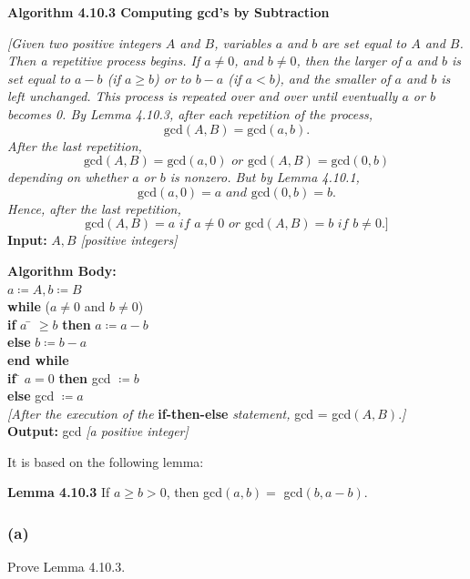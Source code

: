 \documentclass[14pt]{extarticle}
\newcommand{\cy}{\color{cyan}}
\begin{document}
\begin{tcolorbox}[colframe=cyan]
{\bf \cy Algorithm 4.10.3 Computing gcd’s by Subtraction} 

{\it [Given two positive integers $A$ and $B$, variables $a$ and $b$ are set equal to $A$ and $B$. Then a repetitive process begins. If $a \neq 0$, and $b \neq 0$, then the larger of $a$ and $b$ is set equal to $a - b$ (if $a \geq b$) or to $b - a$ (if $a < b$), and the smaller of $a$ and $b$ is left unchanged. This process is repeated over and over until eventually $a$ or $b$ becomes 0. By Lemma 4.10.3, after each repetition of the process,}
\[
\text{gcd}(A, B) = \text{gcd}(a, b).
\]
{\it After the last repetition,}
\[
\text{gcd}(A, B) = \text{gcd}(a, 0) \textit{ or } \text{gcd}(A, B) = \text{gcd}(0, b)
\]
{\it depending on whether $a$ or $b$ is nonzero. But by Lemma 4.10.1,}
\[
\text{gcd}(a, 0) = a \textit{ and } \text{gcd}(0, b) = b.
\]
{\it Hence, after the last repetition,}
\[
\text{gcd}(A,B) = a \textit{ if } a \neq 0 \textit{ or } \text{gcd}(A,B) = b \textit{ if } b \neq 0. \textit{]}
\]
{\bf Input:} $A, B$ {\it[positive integers]}
\begin{tabbing}
{\bf Alg}\={\bf orithm Body:} \\
         \> $a \coloneqq A, b \coloneqq B$ \\
         \> {\bf wh}\={\bf ile} ($a \neq 0$ and $b \neq 0$) \\
         \>          \> {\bf if} $a$ \= $\geq b$ {\bf then} $a \coloneqq a - b$ \\
         \>          \>             \> {\bf else} $b \coloneqq b - a$ \\
         \> {\bf end while} \\
         \> {\bf if} \= $a = 0$ {\bf then} gcd $\coloneqq b$ \\
         \>             \> {\bf else} gcd $\coloneqq a$ \\
         \> {\it [After the execution of the} {\bf if-then-else} {\it statement,} gcd = gcd$(A,B).${\it]} \\
{\bf Output:} gcd {\it [a positive integer]}
\end{tabbing}
\end{tcolorbox}

It is based on the following lemma:

{\bf Lemma 4.10.3} If $a \geq b > 0$, then gcd$(a, b) =$ gcd$(b, a - b)$.

\subsubsection{(a)}
Prove Lemma 4.10.3.
\end{document}

